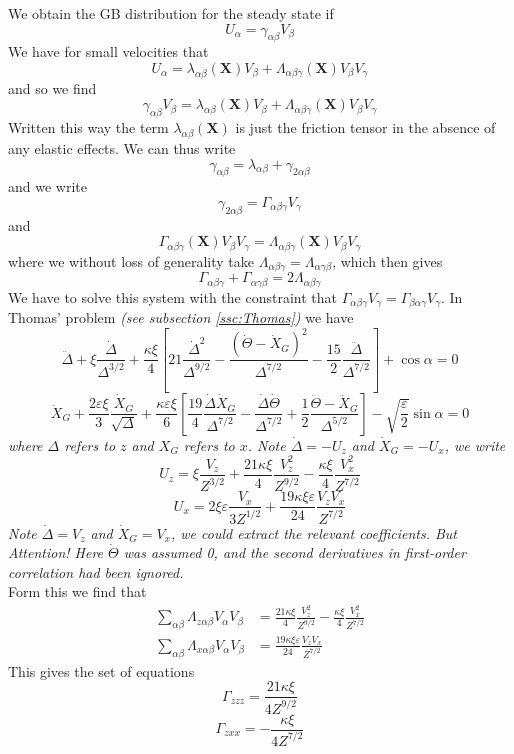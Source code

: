 \documentclass[books,12pt]{elegantpaper}
\newcommand{\beq}{\begin{equation}}
\newcommand{\eeq}{\end{equation}}
\newcommand{\bgn}{\begin{align}}
\newcommand{\tlag}[1]{\tag{#1} \label{#1}}
\newcommand{\veps}{\varepsilon}
\newcommand{\tit}{\textit}
\begin{document}
We obtain the GB distribution for the steady state if 
\beq U_\alpha = \gamma_{\alpha\beta} V_\beta \tlag{David.5} \eeq
We have for small velocities that
\beq U_\alpha = \lambda_{\alpha\beta} (\mathbf{X}) V_\beta + \Lambda_{\alpha\beta\gamma} (\mathbf{X}) V_\beta V_\gamma \tlag{David.6} \eeq
and so we find
\beq \gamma_{\alpha\beta} V_\beta = \lambda_{\alpha\beta}(\mathbf{X}) V_\beta + \Lambda_{\alpha\beta\gamma} (\mathbf{X}) V_\beta V_\gamma \tlag{David.7} \eeq
Written this way the term $\lambda_{\alpha\beta}(\mathbf{X})$ is just the friction tensor in the absence of any elastic effects. We can thus write
\beq \gamma_{\alpha\beta} = \lambda_{\alpha\beta} + \gamma_{2\alpha\beta} \tlag{David.8} \eeq
and we write
\beq \gamma_{2\alpha\beta} = \Gamma_{\alpha\beta\gamma} V_\gamma \tlag{David.9} \eeq
and
\beq \Gamma_{\alpha\beta\gamma} (\mathbf{X}) V_\beta V_\gamma = \Lambda_{\alpha\beta\gamma} (\mathbf{X}) V_\beta V_\gamma \tlag{David.10} \eeq
where we without loss of generality take $\Lambda_{\alpha\beta\gamma} = \Lambda_{\alpha\gamma\beta}$, which then gives
\beq \Gamma_{\alpha\beta\gamma} + \Gamma_{\alpha\gamma\beta} = 2 \Lambda_{\alpha\beta\gamma} \tlag{David.11} \eeq
We have to solve this system with the constraint that $\Gamma_{\alpha\beta\gamma} V_\gamma = \Gamma_{\beta\alpha\gamma} V_\gamma$. In Thomas' problem \tit{(see subsection \ref{ssc:Thomas})} we have
$$ \ddot{\Delta} + \xi \frac{\dot{\Delta}}{\Delta^{3/2}} + \frac{\kappa\xi}{4} \left[ 21 \frac{\dot{\Delta}^2}{\Delta^{9/2}} - \frac{(\dot\Theta - \dot{X}_G)^2}{\Delta^{7/2}} - \frac{15}{2} \frac{\ddot\Delta}{\Delta^{7/2}} \right] + \cos\alpha = 0 $$
$$ \ddot{X}_G + \frac{2\varepsilon \xi}{3} \frac{\dot{X}_G}{\sqrt\Delta} + \frac{\kappa \varepsilon \xi}{6} \left[ \frac{19}{4} \frac{\dot\Delta \dot{X}_G}{\Delta^{7/2}} - \frac{\dot\Delta \dot\Theta}{\Delta^{7/2}} + \frac{1}{2} \frac{\ddot\Theta - \ddot{X}_G}{\Delta^{5/2}} \right] - \sqrt{\frac{\varepsilon}{2}} \sin\alpha = 0 $$
\tit{where $\Delta$ refers to $z$ and $X_G$ refers to $x$. Note $\dot\Delta=-U_z$ and $\dot{X}_G=-U_x$, we write}
\beq U_z = \xi \frac{V_z}{Z^{3/2}} + \frac{21 \kappa \xi}{4} \frac{V_z^2}{Z^{9/2}} - \frac{\kappa \xi}{4} \frac{V_x^2}{Z^{7/2}}  \tlag{David.12} \eeq
\beq U_x = 2 \xi\veps \frac{V_x}{3Z^{1/2}} + \frac{19 \kappa \xi \veps}{24} \frac{V_z V_x}{Z^{7/2}} \tlag{David.13} \eeq
\textit{Note $\dot\Delta = V_z$ and $\dot{X}_G = V_x$, we could extract the relevant coefficients. But Attention! Here $\dot\Theta$ was assumed 0, and the second derivatives in first-order correlation had been ignored.} \\
Form this we find that
\beq \bgn
\sum_{\alpha\beta} \Lambda_{z\alpha\beta} V_\alpha V_\beta &= \frac{21 \kappa \xi}{4} \frac{V_z^2}{Z^{9/2}} - \frac{\kappa \xi}{4} \frac{V_x^2}{Z^{7/2}} \\
\sum_{\alpha\beta} \Lambda_{x\alpha\beta} V_\alpha V_\beta &= \frac{19 \kappa \xi \veps}{24} \frac{V_z V_x}{Z^{7/2}}
\end{align} \tlag{David.14} \eeq
This gives the set of equations
\beq \Gamma_{zzz} = \frac{21 \kappa \xi}{4 Z^{9/2}} \tlag{David.15} \eeq
\beq \Gamma_{zxx} = - \frac{\kappa \xi}{4Z^{7/2}} \tlag{David.16} \eeq
\end{document}
